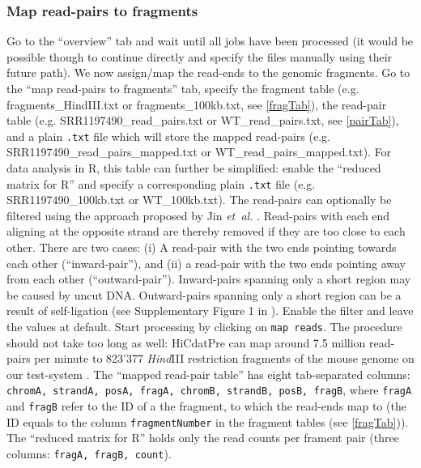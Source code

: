 \documentclass[a4paper,10pt]{article}
\begin{document}
\subsubsection{Map read-pairs to fragments}
Go to the ``overview'' tab and wait until all jobs have been processed (it would be possible though to continue directly and specify the files manually using their future path). We now assign/map the read-ends to the genomic fragments. Go to the ``map read-pairs to fragments'' tab, specify the fragment table (e.g. fragments\_HindIII.txt or fragments\_100kb.txt, see \ref{fragTab}), the read-pair table (e.g. SRR1197490\_read\_pairs.txt or WT\_read\_pairs.txt, see \ref{pairTab}), and a plain \texttt{.txt} file which will store the mapped read-pairs (e.g. SRR1197490\_read\_pairs\_mapped.txt or WT\_read\_pairs\_mapped.txt). For data analysis in R, this table can further be simplified: enable the ``reduced matrix for R'' and specify a corresponding plain \texttt{.txt} file (e.g. SRR1197490\_100kb.txt or WT\_100kb.txt). 
\newline
\newline
The read-pairs can optionally be filtered using the approach proposed by Jin \textit{et~al.} \cite{2013_Jin}. Read-pairs with each end aligning at the opposite strand are thereby removed if they are too close to each other. There are two cases: (i) A read-pair with the two ends pointing towards each other (``inward-pair''), and (ii) a read-pair with the two ends pointing away from each other (``outward-pair''). Inward-pairs spanning only a short region may be caused by uncut DNA. Outward-pairs spanning only a short region can be a result of self-ligation (see Supplementary Figure 1 in \cite{2013_Jin}). Enable the filter and leave the values at default. Start processing by clicking on \texttt{map reads}. The procedure should not take too long as well: HiCdatPre can map around 7.5 million read-pairs per minute to 823'377 \textit{Hind}III restriction fragments of the mouse genome on our test-system \cite{TESTSYSTEM}.
\newline
\newline
The ``mapped read-pair table'' has eight tab-separated columns: \texttt{chromA, strandA, posA, fragA, chromB, strandB, posB, fragB}, where \texttt{fragA} and \texttt{fragB} refer to the ID of a the fragment, to which the read-ends map to (the ID equals to the column \texttt{fragmentNumber} in the fragment tables (see \ref{fragTab})). The ``reduced matrix for R'' holds only the read counts per frament pair (three columns: \texttt{fragA, fragB, count}).
\end{document}
